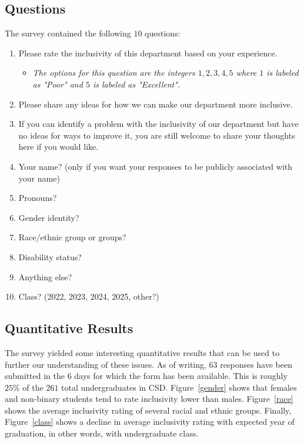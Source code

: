 \documentclass{article}
\begin{document}
\subsection{Questions}
The survey contained the following $10$ questions:
\begin{enumerate}
\item Please rate the inclusivity of this department based on your experience.	
\begin{itemize}
\item
\emph{The options for this question are the integers $1,2,3,4,5$ 
where $1$ is labeled as "Poor" and $5$ is labeled as "Excellent".}
\end{itemize}
\item Please share any ideas for how we can make our department more inclusive.	
\item If you can identify a problem with the inclusivity of our department but have no ideas for ways to improve it, you are still welcome to share your thoughts here if you would like.	
\item Your name? (only if you want your responses to be publicly associated with your name)	
\item Pronouns?	
\item Gender identity?	
\item Race/ethnic group or groups?	
\item Disability status?	
\item Anything else?	
\item Class? (2022, 2023, 2024, 2025, other?)
\end{enumerate}

\subsection{Quantitative Results}
The survey yielded some interesting quantitative results that can be 
used to further our understanding of these issues.
As of writing, $63$ responses have been submitted in the $6$ days for which the form
has been available.
This is roughly $25\%$ of the $261$ total undergraduates in CSD.
Figure~\ref{gender} shows that females and non-binary students tend to rate inclusivity lower than males.
Figure~\ref{race} shows the average inclusivity rating of several racial 
and ethnic groups.
Finally, Figure~\ref{class} shows a decline in average inclusivity rating with 
expected year of graduation, in other words, with undergraduate class.
\end{document}
